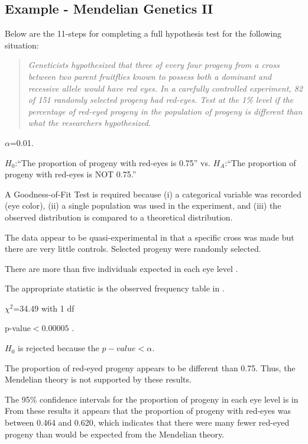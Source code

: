 \documentclass[10pt,openany]{book}\usepackage[]{graphicx}\usepackage[]{color}
\begin{document}
\subsection{Example - Mendelian Genetics II}
Below are the 11-steps  for completing a full hypothesis test for the following situation:
\vspace{-4pt}
\begin{quote}
\textsl{Geneticists hypothesized that three of every four progeny from a cross between two parent fruitflies known to possess both a dominant and recessive allele would have red eyes. In a carefully controlled experiment, 82 of 151 randomly selected progeny had red-eyes. Test at the 1\% level if the percentage of red-eyed progeny in the population of progeny is different than what the researchers hypothesized.}
\end{quote}



\begin{Enumerate}
  \item $\alpha$=0.01.
  \item $H_{0}$:``The proportion of progeny with red-eyes is 0.75'' vs. $H_{A}$:``The proportion of progeny with red-eyes is NOT 0.75.''
  \item A Goodness-of-Fit Test is required because (i) a categorical variable was recorded (eye color), (ii) a single population was used in the experiment, and (iii) the observed distribution is compared to a theoretical distribution.
  \item The data appear to be quasi-experimental in that a specific cross was made but there are very little controls. Selected progeny were randomly selected.
  \item There are more than five individuals expected in each eye level .
  \item The appropriate statistic is the observed frequency table in .
  \item $\chi^2$=34.49 with 1 df 
  \item p-value$<0.00005$ .
  \item $H_{0}$ is rejected because the $p-value<\alpha$.
  \item The proportion of red-eyed progeny appears to be different than 0.75. Thus, the Mendelian theory is not supported by these results.
  \item The 95\% confidence intervals for the proportion of progeny in each eye level is in  From these results it appears that the proportion of progeny with red-eyes was between 0.464 and 0.620, which indicates that there were many fewer red-eyed progeny than would be expected from the Mendelian theory.
\end{Enumerate}
\end{document}
